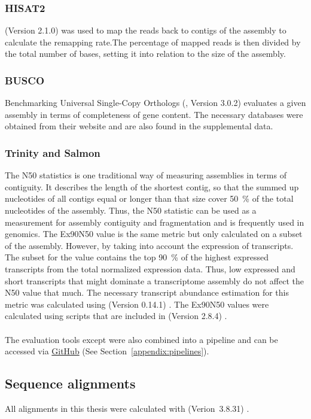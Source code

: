 \documentclass[12pt,a4paper,english]{article}
\begin{document}
\subsubsection*{HISAT2}
	\hisat (Version 2.1.0) \citep{hisat2:15} was used to map the reads back to contigs of the assembly to calculate the remapping rate.The percentage of mapped reads is then divided by the total number of bases, setting it into relation to the size of the assembly.

\subsubsection*{BUSCO}
	Benchmarking Universal Single-Copy Orthologs (\busco, Version 3.0.2) \citep{busco:15,busco:18} evaluates a given assembly in terms of completeness of gene content. The necessary databases were obtained from their website and are also found in the supplemental data.

\subsubsection*{Trinity and Salmon}
	The N50 statistics is one traditional way of measuring assemblies in terms of contiguity. 
	It describes the length of the shortest contig, so that the summed up nucleotides of all contigs equal or longer than that size cover 50~\% of the total nucleotides of the assembly. Thus, the N50 statistic can be used as a measurement for assembly contiguity and fragmentation and is frequently used in genomics.
	The Ex90N50 value is the same metric but only calculated on a subset of the assembly. However, by taking into account the expression of transcripts. The subset for the value contains the top 90~\% of the highest expressed transcripts from the total normalized expression data. 
	Thus, low expressed and short transcripts that might dominate a transcriptome assembly do not affect the N50 value that much.
	The necessary transcript abundance estimation for this metric was calculated using \salmon (Version 0.14.1) \citep{salmon:17}. The Ex90N50 values were calculated using scripts that are included in \trinity (Version 2.8.4) \citep{Trinity:11}.
	\\
	\\
	The evaluation tools except \blast were also combined into a \snakemake pipeline and can be accessed via \href{https://github.com/lmfaber/evaluation}{GitHub} (See Section~\ref{appendix:pipelines}).

\subsection{Sequence alignments}
All alignments in this thesis were calculated with \muscle (Verion~3.8.31) \citep{muscle:04}.
\end{document}
